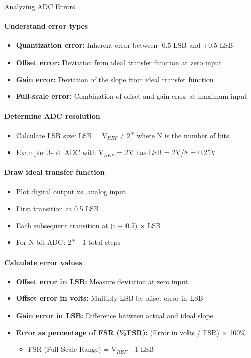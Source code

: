 \begin{KR}{Analyzing ADC Errors}
\paragraph{Understand error types}
\begin{itemize}
    \item \textbf{Quantization error:} Inherent error between -0.5 LSB and +0.5 LSB
    \item \textbf{Offset error:} Deviation from ideal transfer function at zero input
    \item \textbf{Gain error:} Deviation of the slope from ideal transfer function
    \item \textbf{Full-scale error:} Combination of offset and gain error at maximum input
\end{itemize}

\paragraph{Determine ADC resolution}
\begin{itemize}
    \item Calculate LSB size: LSB = V$_{REF}$ / 2$^N$ where N is the number of bits
    \item Example: 3-bit ADC with V$_{REF}$ = 2V has LSB = 2V/8 = 0.25V
\end{itemize}

\paragraph{Draw ideal transfer function}
\begin{itemize}
    \item Plot digital output vs. analog input
    \item First transition at 0.5 LSB
    \item Each subsequent transition at (i + 0.5) × LSB
    \item For N-bit ADC: 2$^N$ - 1 total steps
\end{itemize}

\paragraph{Calculate error values}
\begin{itemize}
    \item \textbf{Offset error in LSB:} Measure deviation at zero input
    \item \textbf{Offset error in volts:} Multiply LSB by offset error in LSB
    \item \textbf{Gain error in LSB:} Difference between actual and ideal slope
    \item \textbf{Error as percentage of FSR (\%FSR):} (Error in volts / FSR) × 100\%
    \begin{itemize}
        \item FSR (Full Scale Range) = V$_{REF}$ - 1 LSB
    \end{itemize}
\end{itemize}
\end{KR}

